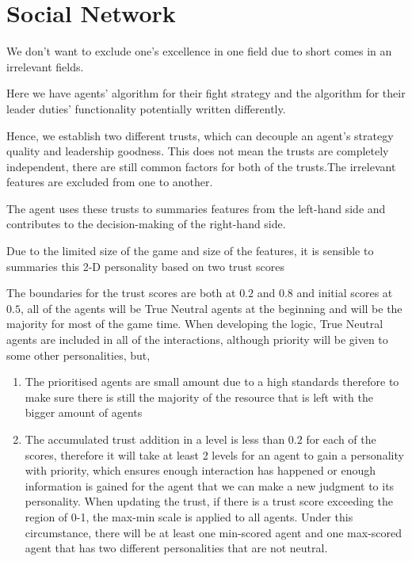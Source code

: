 \section{Social Network}

We don't want to exclude one's excellence in one field due to short comes in an irrelevant fields.

Here we have agents' algorithm for their fight strategy and the algorithm for their leader duties' functionality potentially written differently.

Hence, we establish two different trusts, which can decouple an agent's strategy quality and leadership goodness. This does not mean the trusts are completely independent, there are still common factors for both of the trusts.The irrelevant features are excluded from one to another.

The agent uses these trusts to summaries features from the left-hand side and contributes to the decision-making of the right-hand side.

Due to the limited size of the game and size of the features, it is sensible to summaries this 2-D personality based on two trust scores

The boundaries for the trust scores are both at $0.2$ and $0.8$ and initial scores at $0.5$, all of the agents will be True Neutral agents at the beginning and will be the majority for most of the game time. When developing the logic, True Neutral agents are included in all of the interactions, although priority will be given to some other personalities, but,
\begin{enumerate}
    \item The prioritised agents are small amount due to a high standards therefore to make sure there is still the majority of the resource that is left with the bigger amount of agents
    \item The accumulated trust addition in a level is less than $0.2$ for each of the scores, therefore it will take at least 2 levels for an agent to gain a personality with priority, which ensures enough interaction has happened or enough information is gained for the agent that we can make a new judgment to its personality. When updating the trust, if there is a trust score exceeding the region of 0-1, the max-min scale is applied to all agents. Under this circumstance, there will be at least one min-scored agent and one max-scored agent that has two different personalities that are not neutral.
\end{enumerate}

